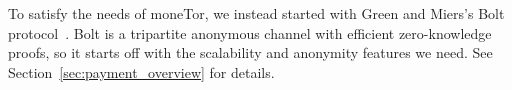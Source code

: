 To satisfy the needs of moneTor, we instead started with Green and Miers's Bolt protocol~\cite{green2017bolt}. Bolt is a tripartite anonymous channel with efficient zero-knowledge proofs, so it starts off with the scalability and anonymity features we need. See Section~\ref{sec:payment_overview} for details.


